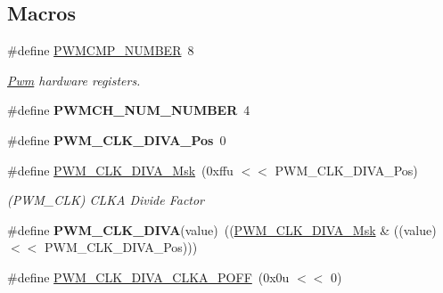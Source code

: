 \subsection*{Macros}
\begin{DoxyCompactItemize}
\item 
\mbox{\label{group__SAMV71__PWM_gace381626974919cd4b1106113a792dd5}} 
\#define \mbox{\hyperlink{group__SAMV71__PWM_gace381626974919cd4b1106113a792dd5}{P\+W\+M\+C\+M\+P\+\_\+\+N\+U\+M\+B\+ER}}~8
\begin{DoxyCompactList}\small\item\em \mbox{\hyperlink{structPwm}{Pwm}} hardware registers. \end{DoxyCompactList}\item 
\mbox{\label{group__SAMV71__PWM_gaac490ccca2dabf7952b692754e13ef7a}} 
\#define {\bfseries P\+W\+M\+C\+H\+\_\+\+N\+U\+M\+\_\+\+N\+U\+M\+B\+ER}~4
\item 
\mbox{\label{group__SAMV71__PWM_gafd838365b1e8ff1cd90d647ab9f91bc8}} 
\#define {\bfseries P\+W\+M\+\_\+\+C\+L\+K\+\_\+\+D\+I\+V\+A\+\_\+\+Pos}~0
\item 
\mbox{\label{group__SAMV71__PWM_ga89c8665c750fe9e496bb150cfac30cd6}} 
\#define \mbox{\hyperlink{group__SAMV71__PWM_ga89c8665c750fe9e496bb150cfac30cd6}{P\+W\+M\+\_\+\+C\+L\+K\+\_\+\+D\+I\+V\+A\+\_\+\+Msk}}~(0xffu $<$$<$ P\+W\+M\+\_\+\+C\+L\+K\+\_\+\+D\+I\+V\+A\+\_\+\+Pos)
\begin{DoxyCompactList}\small\item\em (P\+W\+M\+\_\+\+C\+LK) C\+L\+KA Divide Factor \end{DoxyCompactList}\item 
\mbox{\label{group__SAMV71__PWM_ga16461ed8470a94e042b6b0c7b1eac316}} 
\#define {\bfseries P\+W\+M\+\_\+\+C\+L\+K\+\_\+\+D\+I\+VA}(value)~((\mbox{\hyperlink{group__SAMV71__PWM_ga89c8665c750fe9e496bb150cfac30cd6}{P\+W\+M\+\_\+\+C\+L\+K\+\_\+\+D\+I\+V\+A\+\_\+\+Msk}} \& ((value) $<$$<$ P\+W\+M\+\_\+\+C\+L\+K\+\_\+\+D\+I\+V\+A\+\_\+\+Pos)))
\item 
\mbox{\label{group__SAMV71__PWM_gaf333c9ff5302685fd4ef18860428d30b}} 
\#define \mbox{\hyperlink{group__SAMV71__PWM_gaf333c9ff5302685fd4ef18860428d30b}{P\+W\+M\+\_\+\+C\+L\+K\+\_\+\+D\+I\+V\+A\+\_\+\+C\+L\+K\+A\+\_\+\+P\+O\+FF}}~(0x0u $<$$<$ 0)
$$
\end{DoxyCompactItemize}
